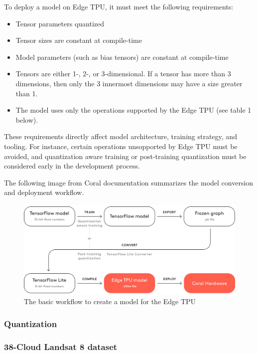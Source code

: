 {To deploy a model on Edge TPU, it must meet the following requirements:
\begin{itemize}
    \item Tensor parameters quantized
    \item Tensor sizes are constant at compile-time
    \item Model parameters (such as bias tensors) are constant at compile-time
    \item Tensors are either 1-, 2-, or 3-dimensional. If a tensor has more than 3 dimensions, then only the 3 innermost dimensions may have a size greater than 1.
    \item The model uses only the operations supported by the Edge TPU (see table 1 below). 
\end{itemize}

These requirements directly affect model architecture, training strategy, and tooling. For instance, certain operations unsopported by Edge TPU must be avoided, and quantization aware training or post-training quantization must be considered early in the development process.

The following image from Coral documentation summarizes the model conversion and deployment workflow.

\begin{figure}[H]
  \centering
  \includegraphics[width=\textwidth]{files/Edge_TPU_quantization.png}
  \caption{The basic workflow to create a model for the Edge TPU}
  \label{fig:quantization-chart}
\end{figure}

\subsubsection{Quantization}

\subsubsection{38-Cloud Landsat 8 dataset}

}
